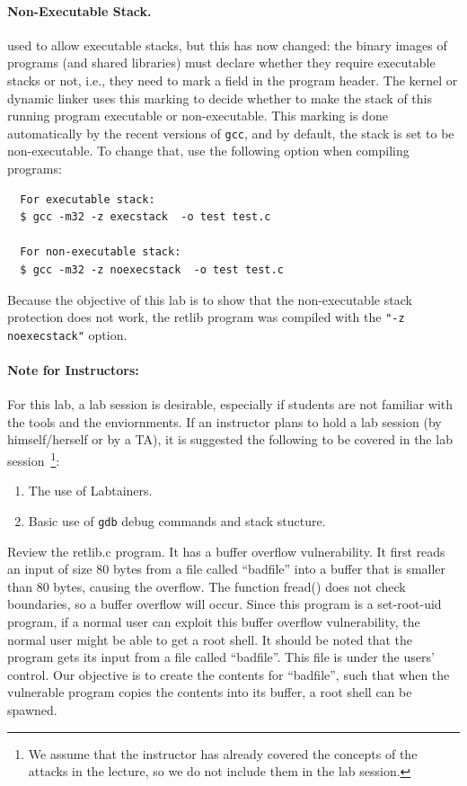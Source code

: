 \paragraph{Non-Executable Stack.} \ubuntu used to allow executable stacks,
but this has now changed: the binary images of programs (and shared
libraries) must declare whether they require executable stacks or not,
i.e., they need to mark a field in the program header. The kernel or dynamic
linker uses this marking to decide whether to make the stack of this
running program executable or non-executable. This marking is done
automatically by the recent versions of {\tt gcc}, and by default, the
stack is set to be non-executable.  
To change that, use the following option when compiling programs:
\begin{verbatim}
  For executable stack:
  $ gcc -m32 -z execstack  -o test test.c

  For non-executable stack:
  $ gcc -m32 -z noexecstack  -o test test.c
\end{verbatim}


Because the objective of this lab is to show that the non-executable stack
protection does not work, the retlib program was compiled with the 
{\tt "-z noexecstack"} option.


\paragraph {Note for Instructors:} 
For this lab, a lab session is desirable, especially if students are
not familiar with the tools and the enviornments. If an instructor
plans to hold a lab session (by himself/herself or by a TA), it
is suggested the following to be covered in the
lab session~\footnote{We assume that the instructor has already covered
the concepts of the attacks in the lecture, so we do not include
them in the lab session.}:
\begin{enumerate}
  \item The use of Labtainers. 

  \item Basic use of {\tt gdb} debug commands and stack stucture.

\end{enumerate}

Review the retlib.c program.
It has a buffer overflow vulnerability. It first reads
an input of size 80 bytes from a file called ``badfile'' into a buffer
that is smaller than 80 bytes, causing the overflow. The function fread() does not check
boundaries, so a buffer overflow will occur.  Since this program is a
set-root-uid program, if a normal user can exploit this buffer
overflow vulnerability, the normal user might be able to get a root
shell.  It should be noted that the program gets its input from a file
called ``badfile''. This file is under the users' control. Our
objective is to create the contents for ``badfile'', such that when
the vulnerable program copies the contents into its buffer, a root
shell can be spawned.

